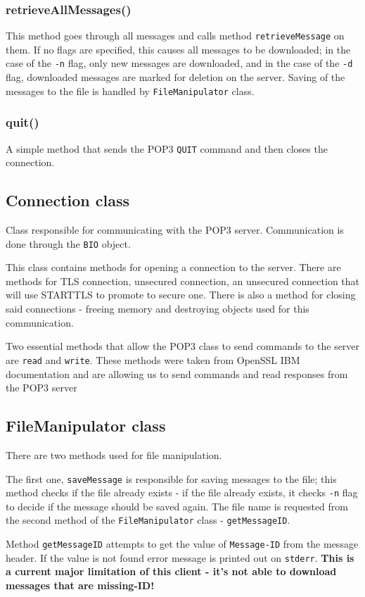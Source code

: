 \documentclass{article}
\begin{document}
\subsubsection{retrieveAllMessages()}
\par
This method goes through all messages and calls method \verb|retrieveMessage| on them.
If no flags are specified, this causes all messages to be downloaded; in the case of the \verb|-n| flag, only new messages are downloaded, and in the case of the \verb|-d| flag, downloaded messages are marked for deletion on the server. Saving of the messages to the file is handled by \verb|FileManipulator| class.

\subsubsection{quit()}
\par
A simple method that sends the POP3 \verb|QUIT| command and then closes the connection.

\subsection{Connection class}
\par
Class responsible for communicating with the POP3 server. Communication is done through the \verb|BIO| object.
\par
This class contains methods for opening a connection to the server. There are methods for TLS connection, unsecured connection, an unsecured connection that will use STARTTLS to promote to secure one.
There is also a method for closing said connections - freeing memory and destroying objects used for this communication.
\par
Two essential methods that allow the POP3 class to send commands to the server are \verb|read| and \verb|write|. These methods were taken from OpenSSL IBM documentation and are allowing us to send commands and read responses from the POP3 server

\subsection{FileManipulator class}
\par
There are two methods used for file manipulation.
\par
The first one, \verb|saveMessage| is responsible for saving messages to the file; this method checks if the file already exists - if the file already exists, it checks \verb|-n| flag to decide if the message should be saved again. The file name is requested from the second method of the \verb|FileManipulator| class - \verb|getMessageID|.
\par
Method \verb|getMessageID| attempts to get the value of \verb|Message-ID| from the message header. If the value is not found error message is printed out on \verb|stderr|. \textbf{This is a current major limitation of this client - it's not able to download messages that are missing-ID!}
\end{document}
